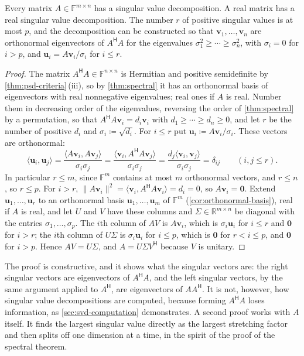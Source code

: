 \begin{theorem}
\label{thm:svd}
Every matrix $A\in\mathbb F^{m\times n}$ has a singular value decomposition. A real matrix has a real singular value decomposition. The number $r$ of positive singular values is at most $p$, and the decomposition can be constructed so that $\mathbf v_1,\ldots,\mathbf v_n$ are orthonormal eigenvectors of $A^{\mathsf H}A$ for the eigenvalues $\sigma_1^2\ge\cdots\ge\sigma_n^2$, with $\sigma_i=0$ for $i>p$, and $\mathbf u_i=A\mathbf v_i/\sigma_i$ for $i\le r$.
\end{theorem}

\begin{proof}
The matrix $A^{\mathsf H}A\in\mathbb F^{n\times n}$ is Hermitian and positive semidefinite by \cref{thm:psd-criteria}\,(iii), so by \cref{thm:spectral} it has an orthonormal basis of eigenvectors with real nonnegative eigenvalues; real ones if $A$ is real. Number them in decreasing order of the eigenvalues, reversing the order of \cref{thm:spectral} by a permutation, so that $A^{\mathsf H}A\mathbf v_i=d_i\mathbf v_i$ with $d_1\ge\cdots\ge d_n\ge0$, and let $r$ be the number of positive $d_i$ and $\sigma_i\coloneqq\sqrt{d_i}$. For $i\le r$ put $\mathbf u_i\coloneqq A\mathbf v_i/\sigma_i$. These vectors are orthonormal:
\[
\langle\mathbf u_i,\mathbf u_j\rangle=\frac{\langle A\mathbf v_i,A\mathbf v_j\rangle}{\sigma_i\sigma_j}=\frac{\langle\mathbf v_i,A^{\mathsf H}A\mathbf v_j\rangle}{\sigma_i\sigma_j}=\frac{d_j\langle\mathbf v_i,\mathbf v_j\rangle}{\sigma_i\sigma_j}=\delta_{ij}\qquad(i,j\le r).
\]
In particular $r\le m$, since $\mathbb F^m$ contains at most $m$ orthonormal vectors, and $r\le n$, so $r\le p$. For $i>r$, $\|A\mathbf v_i\|^2=\langle\mathbf v_i,A^{\mathsf H}A\mathbf v_i\rangle=d_i=0$, so $A\mathbf v_i=\mathbf 0$. Extend $\mathbf u_1,\ldots,\mathbf u_r$ to an orthonormal basis $\mathbf u_1,\ldots,\mathbf u_m$ of $\mathbb F^m$ (\cref{cor:orthonormal-basis}), real if $A$ is real, and let $U$ and $V$ have these columns and $\Sigma\in\mathbb R^{m\times n}$ be diagonal with the entries $\sigma_1,\ldots,\sigma_p$. The $i$th column of $AV$ is $A\mathbf v_i$, which is $\sigma_i\mathbf u_i$ for $i\le r$ and $\mathbf 0$ for $i>r$; the $i$th column of $U\Sigma$ is $\sigma_i\mathbf u_i$ for $i\le p$, which is $\mathbf 0$ for $r<i\le p$, and $\mathbf 0$ for $i>p$. Hence $AV=U\Sigma$, and $A=U\Sigma V^{\mathsf H}$ because $V$ is unitary.
\end{proof}

The proof is constructive, and it shows what the singular vectors are: the right singular vectors are eigenvectors of $A^{\mathsf H}A$, and the left singular vectors, by the same argument applied to $A^{\mathsf H}$, are eigenvectors of $AA^{\mathsf H}$. It is not, however, how singular value decompositions are computed, because forming $A^{\mathsf H}A$ loses information, as \cref{sec:svd-computation} demonstrates. A second proof works with $A$ itself. It finds the largest singular value directly as the largest stretching factor and then splits off one dimension at a time, in the spirit of the proof of the spectral theorem.

